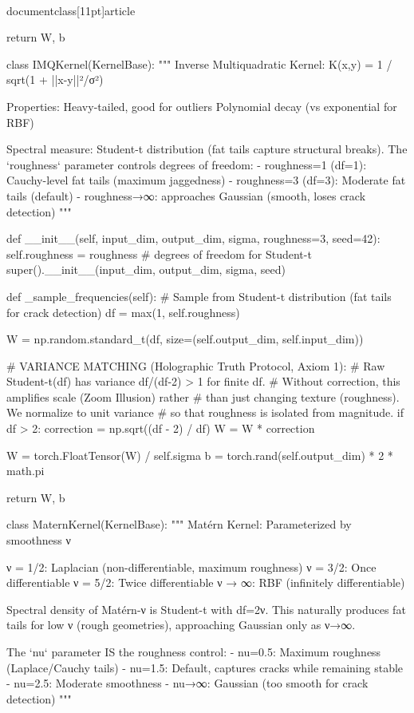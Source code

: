 \\documentclass[11pt]{article}
\begin{document}
\begin{CodeBlock}
        return W, b


class IMQKernel(KernelBase):
    """
    Inverse Multiquadratic Kernel: K(x,y) = 1 / sqrt(1 + ||x-y||²/σ²)

    Properties: Heavy-tailed, good for outliers
    Polynomial decay (vs exponential for RBF)

    Spectral measure: Student-t distribution (fat tails capture structural breaks).
    The `roughness` parameter controls degrees of freedom:
      - roughness=1 (df=1): Cauchy-level fat tails (maximum jaggedness)
      - roughness=3 (df=3): Moderate fat tails (default)
      - roughness→∞: approaches Gaussian (smooth, loses crack detection)
    """

    def __init__(self, input_dim, output_dim, sigma, roughness=3, seed=42):
        self.roughness = roughness  # degrees of freedom for Student-t
        super().__init__(input_dim, output_dim, sigma, seed)

    def _sample_frequencies(self):
        # Sample from Student-t distribution (fat tails for crack detection)
        df = max(1, self.roughness)

        W = np.random.standard_t(df, size=(self.output_dim, self.input_dim))

        # VARIANCE MATCHING (Holographic Truth Protocol, Axiom 1):
        # Raw Student-t(df) has variance df/(df-2) > 1 for finite df.
        # Without correction, this amplifies scale (Zoom Illusion) rather
        # than just changing texture (roughness). We normalize to unit variance
        # so that roughness is isolated from magnitude.
        if df > 2:
            correction = np.sqrt((df - 2) / df)
            W = W * correction

        W = torch.FloatTensor(W) / self.sigma
        b = torch.rand(self.output_dim) * 2 * math.pi

        return W, b


class MaternKernel(KernelBase):
    """
    Matérn Kernel: Parameterized by smoothness ν

    ν = 1/2: Laplacian (non-differentiable, maximum roughness)
    ν = 3/2: Once differentiable
    ν = 5/2: Twice differentiable
    ν → ∞: RBF (infinitely differentiable)

    Spectral density of Matérn-ν is Student-t with df=2ν.
    This naturally produces fat tails for low ν (rough geometries),
    approaching Gaussian only as ν→∞.

    The `nu` parameter IS the roughness control:
      - nu=0.5: Maximum roughness (Laplace/Cauchy tails)
      - nu=1.5: Default, captures cracks while remaining stable
      - nu=2.5: Moderate smoothness
      - nu→∞: Gaussian (too smooth for crack detection)
    """


\end{CodeBlock}
\end{document}
